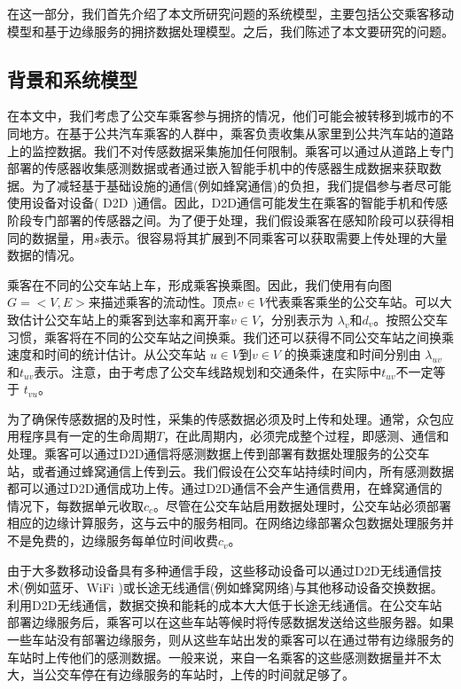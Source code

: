 在这一部分，我们首先介绍了本文所研究问题的系统模型，主要包括公交乘客移动模型和基于边缘服务的拥挤数据处理模型。之后，我们陈述了本文要研究的问题。

\subsection{背景和系统模型}

在本文中，我们考虑了公交车乘客参与拥挤的情况，他们可能会被转移到城市的不同地方。在基于公共汽车乘客的人群中，乘客负责收集从家里到公共汽车站的道路上的监控数据。我们不对传感数据采集施加任何限制。乘客可以通过从道路上专门部署的传感器收集感测数据或者通过嵌入智能手机中的传感器生成数据来获取数据。为了减轻基于基础设施的通信(例如蜂窝通信)的负担，我们提倡参与者尽可能使用设备对设备( D2D )通信。因此，D2D通信可能发生在乘客的智能手机和传感阶段专门部署的传感器之间。为了便于处理，我们假设乘客在感知阶段可以获得相同的数据量，用$s$表示。很容易将其扩展到不同乘客可以获取需要上传处理的大量数据的情况。


乘客在不同的公交车站上车，形成乘客换乘图。因此，我们使用有向图$G=<V, E>$来描述乘客的流动性。顶点$v\in V$代表乘客乘坐的公交车站。可以大致估计公交车站上的乘客到达率和离开率$v\in V$，分别表示为 $\lambda_v$和$d_v$。按照公交车习惯，乘客将在不同的公交车站之间换乘。我们还可以获得不同公交车站之间换乘速度和时间的统计估计。从公交车站 $u\in V$到$v\in V$ 的换乘速度和时间分别由 $\lambda_{uv}$和$t_{uv}$表示。注意，由于考虑了公交车线路规划和交通条件，在实际中$t_{uv}$不一定等于 $t_{vu}$。

为了确保传感数据的及时性，采集的传感数据必须及时上传和处理。通常，众包应用程序具有一定的生命周期$T$，在此周期内，必须完成整个过程，即感测、通信和处理。乘客可以通过D2D通信将感测数据上传到部署有数据处理服务的公交车站，或者通过蜂窝通信上传到云。我们假设在公交车站持续时间内，所有感测数据都可以通过D2D通信成功上传。通过D2D通信不会产生通信费用，在蜂窝通信的情况下，每数据单元收取$c_c$。尽管在公交车站启用数据处理时，公交车站必须部署相应的边缘计算服务，这与云中的服务相同。在网络边缘部署众包数据处理服务并不是免费的，边缘服务每单位时间收费$c_v$。


由于大多数移动设备具有多种通信手段，这些移动设备可以通过D2D无线通信技术(例如蓝牙、WiFi )或长途无线通信(例如蜂窝网络)与其他移动设备交换数据。利用D2D无线通信，数据交换和能耗的成本大大低于长途无线通信。在公交车站部署边缘服务后，乘客可以在这些车站等候时将传感数据发送给这些服务器。如果一些车站没有部署边缘服务，则从这些车站出发的乘客可以在通过带有边缘服务的车站时上传他们的感测数据。一般来说，来自一名乘客的这些感测数据量并不太大，当公交车停在有边缘服务的车站时，上传的时间就足够了。

